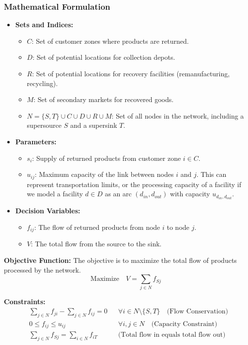 \documentclass{article}
\begin{document}
\subsubsection{Mathematical Formulation}

\begin{itemize}
    \item \textbf{Sets and Indices:}
    \begin{itemize}
        \item $C$: Set of customer zones where products are returned.
        \item $D$: Set of potential locations for collection depots.
        \item $R$: Set of potential locations for recovery facilities (remanufacturing, recycling).
        \item $M$: Set of secondary markets for recovered goods.
        \item $N = \{S, T\} \cup C \cup D \cup R \cup M$: Set of all nodes in the network, including a supersource $S$ and a supersink $T$.
    \end{itemize}
    \item \textbf{Parameters:}
    \begin{itemize}
        \item $s_i$: Supply of returned products from customer zone $i \in C$.
        \item $u_{ij}$: Maximum capacity of the link between nodes $i$ and $j$. This can represent transportation limits, or the processing capacity of a facility if we model a facility $d \in D$ as an arc $(d_{in}, d_{out})$ with capacity $u_{d_{in}, d_{out}}$.
    \end{itemize}
    \item \textbf{Decision Variables:}
    \begin{itemize}
        \item $f_{ij}$: The flow of returned products from node $i$ to node $j$.
        \item $V$: The total flow from the source to the sink.
    \end{itemize}
\end{itemize}

\textbf{Objective Function:}
The objective is to maximize the total flow of products processed by the network.
\begin{equation}
\text{Maximize} \quad V = \sum_{j \in N} f_{Sj}
\end{equation}

\textbf{Constraints:}
\begin{align}
& \sum_{j \in N} f_{ji} - \sum_{j \in N} f_{ij} = 0 && \forall i \in N \setminus \{S, T\} \quad \text{(Flow Conservation)}\\
& 0 \leq f_{ij} \leq u_{ij} && \forall i, j \in N \quad \text{(Capacity Constraint)}\\
& \sum_{j \in N} f_{Sj} = \sum_{i \in N} f_{iT} && \text{(Total flow in equals total flow out)}
\end{align}
\end{document}
